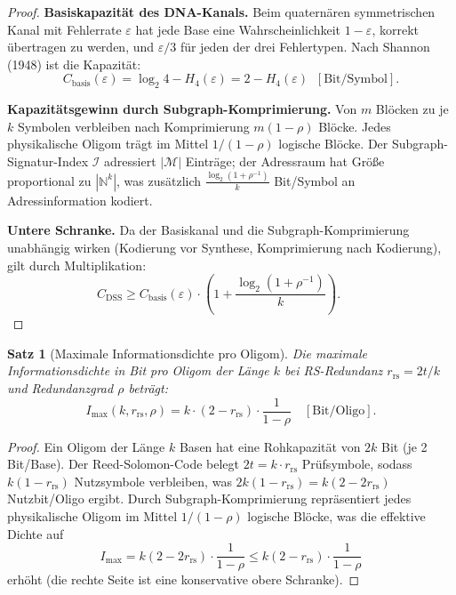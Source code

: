 ﻿\documentclass[a4paper,12pt]{article}
\theoremstyle{definition}
\theoremstyle{plain}
\newtheorem{satz}{Satz}[section]
\begin{document}
\begin{proof}
  \textbf{Basiskapazität des DNA-Kanals.}
  Beim quaternären symmetrischen Kanal mit Fehlerrate $\varepsilon$ hat jede
  Base eine Wahrscheinlichkeit $1-\varepsilon$, korrekt übertragen zu werden,
  und $\varepsilon/3$ für jeden der drei Fehlertypen.  Nach Shannon (1948)
  ist die Kapazität:
  \[
    C_{\mathrm{basis}}(\varepsilon)
    = \log_2 4 - H_4(\varepsilon)
    = 2 - H_4(\varepsilon) \;\; [\text{Bit/Symbol}].
  \]

  \textbf{Kapazitätsgewinn durch Subgraph-Komprimierung.}
  Von $m$ Blöcken zu je $k$ Symbolen verbleiben nach Komprimierung
  $m(1-\rho)$ Blöcke.  Jedes physikalische Oligom trägt im Mittel
  $1/(1-\rho)$ logische Blöcke.  Der Subgraph-Signatur-Index $\mathcal{I}$
  adressiert $|\mathcal{M}|$ Einträge; der Adressraum hat Größe
  proportional zu $|\mathbb{N}^k|$, was zusätzlich
  $\frac{\log_2(1 + \rho^{-1})}{k}$ Bit/Symbol an Adressinformation
  kodiert.

  \textbf{Untere Schranke.}
  Da der Basiskanal und die Subgraph-Komprimierung unabhängig
  wirken (Kodierung vor Synthese, Komprimierung nach Kodierung), gilt
  durch Multiplikation:
  \[
    C_{\mathrm{DSS}} \ge C_{\mathrm{basis}}(\varepsilon) \cdot
    \left(1 + \frac{\log_2(1+\rho^{-1})}{k}\right). \qquad 
  \]
\end{proof}

\begin{satz}[Maximale Informationsdichte pro Oligom]
\label{satz:max_dichte}
  Die maximale Informationsdichte in Bit pro Oligom der Länge $k$ bei
  RS-Redundanz $r_{\mathrm{rs}} = 2t/k$ und Redundanzgrad $\rho$ beträgt:
  \[
    I_{\max}(k, r_{\mathrm{rs}}, \rho) =
    k \cdot (2 - r_{\mathrm{rs}}) \cdot \frac{1}{1-\rho}
    \quad [\text{Bit/Oligo}].
  \]
\end{satz}

\begin{proof}
  Ein Oligom der Länge $k$ Basen hat eine Rohkapazität von
  $2k$ Bit (je 2 Bit/Base).  Der Reed-Solomon-Code belegt
  $2t = k \cdot r_{\mathrm{rs}}$ Prüfsymbole, sodass
  $k(1-r_{\mathrm{rs}})$ Nutzsymbole verbleiben, was
  $2k(1-r_{\mathrm{rs}}) = k(2-2r_{\mathrm{rs}})$ Nutzbit/Oligo ergibt.
  Durch Subgraph-Komprimierung repräsentiert jedes physikalische Oligom
  im Mittel $1/(1-\rho)$ logische Blöcke, was die effektive Dichte auf
  \[
    I_{\max} = k(2 - 2r_{\mathrm{rs}}) \cdot \frac{1}{1-\rho}
    \le k(2 - r_{\mathrm{rs}}) \cdot \frac{1}{1-\rho}
  \]
  erhöht (die rechte Seite ist eine konservative obere Schranke). 
\end{proof}
\end{document}
